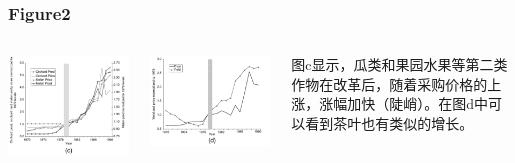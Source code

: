 \documentclass{beamer}
\begin{document}
\begin{frame}
\frametitle{Figure2}
	\begin{columns}
            \begin{minipage}[c][0.4\textheight][c]{\linewidth}
                \centering
                \includegraphics[width=0.8\linewidth]{figure2_c}
            \end{minipage}
            \begin{minipage}[c][0.4\textheight][c]{\linewidth}
                \centering
                \includegraphics[width=0.8\linewidth]{figure2_d}
            \end{minipage}

           	\begin{minipage}[c][0.4\textheight][c]{\linewidth}
            图c显示，瓜类和果园水果等第二类作物在改革后，随着采购价格的上涨，涨幅加快（陡峭）。在图d中可以看到茶叶也有类似的增长。
            \end{minipage}
    \end{columns}
\end{frame}
\end{document}
